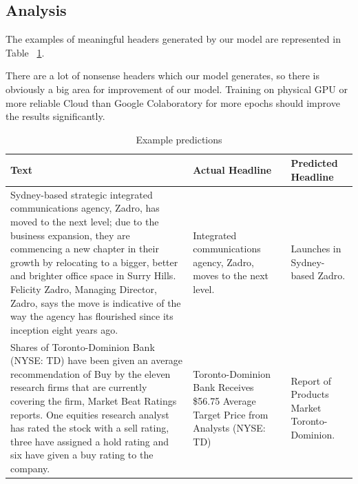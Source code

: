 \subsection{Analysis}

The examples of meaningful headers generated by our model are represented in 
Table ~\ref{tab:results-table}.

There are a lot of nonsense headers which our model generates, so there is obviously a big area for improvement of our model. Training on physical GPU or more reliable Cloud than Google Colaboratory for more epochs should improve the results significantly.

\begin{center}
\begin{table}[!htb]
\centering
\caption{Example predictions}
\label{tab:results-table}
\begin{tabular}{|l|l|l|}
\hline
\textbf{Text} & \textbf{Actual Headline} & \textbf{Predicted Headline} \\ \hline

\begin{minipage}[t]{0.4\columnwidth}%
Sydney-based strategic integrated communications agency, Zadro, has moved to the next level; due to the business expansion, they are commencing a new chapter in their growth by relocating to a bigger, better and brighter office space in Surry Hills. Felicity Zadro, Managing Director, Zadro, says the move is indicative of the way the agency has flourished since its inception eight years ago.             
\end{minipage}
 & 
\begin{minipage}[t]{0.3\columnwidth}%
 Integrated communications agency, Zadro, moves to the next level. 
\end{minipage}
 & 
\begin{minipage}[t]{0.3\columnwidth}%
 Launches in Sydney-based Zadro. 
\end{minipage}  \\ \hline

\begin{minipage}[t]{0.4\columnwidth}%
Shares of Toronto-Dominion Bank (NYSE: TD) have been given an average recommendation of Buy by the eleven research firms that are currently covering the firm, Market Beat Ratings reports. One equities research analyst has rated the stock with a sell rating, three have assigned a hold rating and six have given a buy rating to the company.           
\end{minipage}
 & 
\begin{minipage}[t]{0.3\columnwidth}%
Toronto-Dominion Bank Receives \$56.75 Average Target Price from Analysts (NYSE: TD) 
\end{minipage}
 & 
\begin{minipage}[t]{0.3\columnwidth}%
Report of Products Market Toronto-Dominion. 
\end{minipage}  \\ \hline


\end{tabular}
\end{table}
\end{center}
